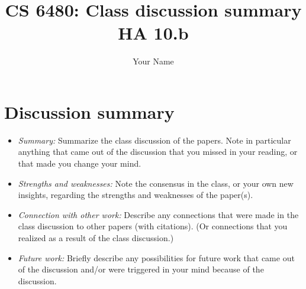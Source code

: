 \documentclass[letterpaper,twocolumn,10pt]{article}
\title{CS 6480: Class discussion summary\\
HA 10.b\\}
\author{Your Name}
\affil{School of Computing, University of Utah}
\begin{document}
\maketitle
\section*{Discussion summary}

\begin{itemize}

\item {\it Summary:} Summarize the class discussion of the papers. Note in
particular anything that came out of the discussion that you missed in your
reading, or that made you change your mind. 

\item {\it Strengths and weaknesses:} Note the consensus
in the class, or your own new insights, regarding the strengths and
weaknesses of the paper(s).

\item {\it Connection with other work:} Describe any connections that were made in
the class discussion to other papers (with citations). (Or connections that you realized
as a result of the class discussion.)

\item {\it Future work:} Briefly describe any possibilities
for future work that came out of the discussion and/or were triggered
in your mind because of the discussion.

\end{itemize}
{
  \small 
  
  
}
\end{document}
